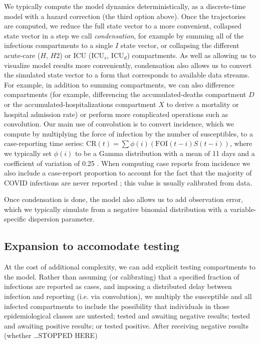 \documentclass[12pt]{article}\usepackage[]{graphicx}\usepackage[]{color}
\begin{document}
We typically compute the model dynamics deterministically, as a discrete-time model with a hazard
correction (the third option above).  Once the trajectories are computed, we reduce the full state vector to a more convenient, collapsed state vector in a step we call \emph{condensation}, for
example by summing all of the infectious compartments to a single $I$ state vector, or collapsing the different acute-care ($H$, $H2$) or ICU ($\textrm{ICU}_s$, $\textrm{ICU}_d$) compartments. 
As well as allowing us to visualize model results more conveniently, condensation also allows us to
convert the simulated state vector to a form that corresponds to available data streams.
For example, in addition to summing compartments, we can also difference compartments (for example, differencing
the accumulated-deaths compartment $D$ or the accumulated-hospitalizations compartment $X$ to
derive a mortality or hospital admission rate) or perform more complicated operations such as convolution. Our main use of convolution is to convert incidence, which we compute by multiplying the force of infection by the number of susceptibles, to a case-reporting time series: $\textrm{CR}(t) = \sum \phi(i) (\textrm{FOI}(t-i) S(t-i))$, where we typically set $\phi(i)$ to be a Gamma distribution with a mean of 11 days and a coefficient of variation of 0.25 . When computing case reports from incidence we also include a case-report proportion  to account for the fact that the majority of COVID infections are never reported \cite{Doug+2020}; this value is usually calibrated from data.

Once condensation is done, the model also allows us to add observation error, which we typically simulate from a negative binomial distribution with a variable-specific dispersion parameter.

\subsection*{Expansion to accomodate testing}

At the cost of additional complexity, we can add explicit testing compartments to the model.
Rather than assuming (or calibrating) that a specified fraction of infections are reported as cases, and imposing a
distributed delay between infection and reporting (i.e. via convolution), we multiply the susceptible
and all infected compartments to include the possibility that individuals in those epidemiological classes
are untested; tested and awaiting negative results; tested and awaiting positive results; or tested positive.
After receiving negative results (whether \ldots STOPPED HERE)
\end{document}
